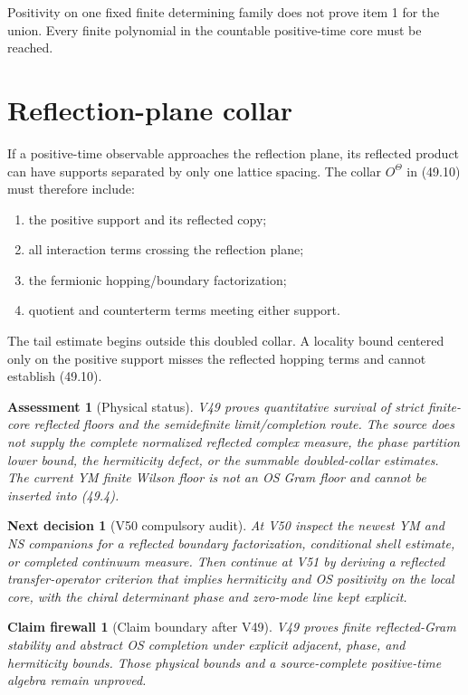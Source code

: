 \documentclass[11pt]{article}
\newtheorem{firewall}[theorem]{Claim firewall}
\newtheorem{decision}[theorem]{Next decision}
\newtheorem{assessment}[theorem]{Assessment}
\theoremstyle{remark}
\begin{document}
Positivity on one fixed finite determining family does not prove
item 1 for the union.  Every finite polynomial in the countable
positive-time core must be reached.

\section{Reflection-plane collar}

If a positive-time observable approaches the reflection plane, its
reflected product can have supports separated by only one lattice
spacing.  The collar \(O^\Theta\) in (49.10) must therefore include:
\begin{enumerate}
\item the positive support and its reflected copy;
\item all interaction terms crossing the reflection plane;
\item the fermionic hopping/boundary factorization;
\item quotient and counterterm terms meeting either support.
\end{enumerate}
The tail estimate begins outside this doubled collar.  A locality
bound centered only on the positive support misses the reflected
hopping terms and cannot establish (49.10).

\begin{assessment}[Physical status]
\label{ass:v15v49-status}
V49 proves quantitative survival of strict finite-core reflected
floors and the semidefinite limit/completion route.  The source does
not supply the complete normalized reflected complex measure, the
phase partition lower bound, the hermiticity defect, or the
summable doubled-collar estimates.  The current YM finite Wilson
floor is not an OS Gram floor and cannot be inserted into (49.4).
\end{assessment}

\begin{decision}[V50 compulsory audit]
\label{dec:v15v49-next}
At V50 inspect the newest YM and NS companions for a reflected
boundary factorization, conditional shell estimate, or completed
continuum measure.  Then continue at V51 by deriving a reflected
transfer-operator criterion that implies hermiticity and OS
positivity on the local core, with the chiral determinant phase and
zero-mode line kept explicit.
\end{decision}

\begin{firewall}[Claim boundary after V49]
\label{fire:v15v49}
V49 proves finite reflected-Gram stability and abstract OS
completion under explicit adjacent, phase, and hermiticity bounds.
Those physical bounds and a source-complete positive-time algebra
remain unproved.
\end{firewall}
\end{document}
